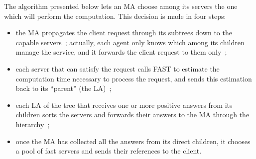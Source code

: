 The algorithm presented below lets an MA choose among its servers the one which
will perform the computation. This decision is made in four steps:
\begin{itemize}
\item the MA propagates the client request through its subtrees down to the
  capable servers~; actually, each agent only knows which among its children manage
  the service, and it forwards the client request to them only~;
\item each server that can satisfy the request calls FAST to estimate the
  computation time necessary to process the request, and sends this
  estimation back to its ``parent'' (the LA)~;
\item each LA of the tree that receives one or more positive answers from its
  children sorts the servers and forwards their answers to the MA through the
  hierarchy~;
\item once the MA has collected all the answers from its direct children, it
  chooses a pool of fast servers and sends their references to the client.
\end{itemize}


